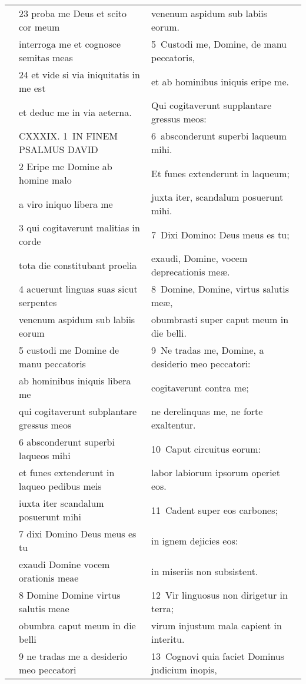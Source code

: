 \documentclass{article}
\begin{document}
\begin{longtable}{@{}p{}p{}p{}@{}}
	&	23 proba me Deus et scito cor meum	&	venenum aspidum sub labiis eorum.	\\
	&	interroga me et cognosce semitas meas	&	5 Custodi me, Domine, de manu peccatoris,	\\
	&	24 et vide si via iniquitatis in me est	&	et ab hominibus iniquis eripe me.	\\
	&	et deduc me in via aeterna.	&	Qui cogitaverunt supplantare gressus meos:	\\
	&	CXXXIX. 1 IN FINEM PSALMUS DAVID	&	6 absconderunt superbi laqueum mihi.	\\
	&	2 Eripe me Domine ab homine malo	&	Et funes extenderunt in laqueum;	\\
	&	a viro iniquo libera me	&	juxta iter, scandalum posuerunt mihi.	\\
	&	3 qui cogitaverunt malitias in corde	&	7 Dixi Domino: Deus meus es tu;	\\
	&	tota die constitubant proelia	&	exaudi, Domine, vocem deprecationis meæ.	\\
	&	4 acuerunt linguas suas sicut serpentes	&	8 Domine, Domine, virtus salutis meæ,	\\
	&	venenum aspidum sub labiis eorum	&	obumbrasti super caput meum in die belli.	\\
	&	5 custodi me Domine de manu peccatoris	&	9 Ne tradas me, Domine, a desiderio meo peccatori:	\\
	&	ab hominibus iniquis libera me	&	cogitaverunt contra me;	\\
	&	qui cogitaverunt subplantare gressus meos	&	ne derelinquas me, ne forte exaltentur.	\\
	&	6 absconderunt superbi laqueos mihi	&	10 Caput circuitus eorum:	\\
	&	et funes extenderunt in laqueo pedibus meis	&	labor labiorum ipsorum operiet eos.	\\
	&	iuxta iter scandalum posuerunt mihi	&	11 Cadent super eos carbones;	\\
	&	7 dixi Domino Deus meus es tu	&	in ignem dejicies eos:	\\
	&	exaudi Domine vocem orationis meae	&	in miseriis non subsistent.	\\
	&	8 Domine Domine virtus salutis meae	&	12 Vir linguosus non dirigetur in terra;	\\
	&	obumbra caput meum in die belli	&	virum injustum mala capient in interitu.	\\
	&	9 ne tradas me a desiderio meo peccatori	&	13 Cognovi quia faciet Dominus judicium inopis,	\\

\end{longtable}
\end{document}
